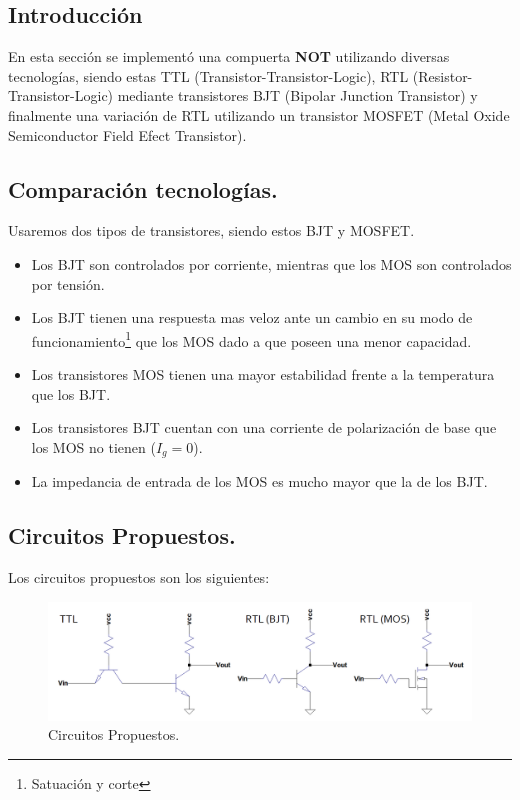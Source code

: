 \documentclass[a4paper]{article}
\begin{document}
\subsection{Introducción}
En esta sección se implementó una compuerta \textbf{NOT} utilizando diversas tecnologías, siendo estas TTL (Transistor-Transistor-Logic), RTL (Resistor-Transistor-Logic) mediante transistores BJT (Bipolar Junction Transistor) y finalmente una variación de RTL utilizando un transistor MOSFET (Metal Oxide Semiconductor Field Efect Transistor).
\subsection{Comparación tecnologías.}
Usaremos dos tipos de transistores, siendo estos BJT y MOSFET.
\begin{itemize}
\item Los BJT son controlados por corriente, mientras que los MOS son controlados por tensión.
\item Los BJT tienen una respuesta mas veloz ante un cambio en su modo de funcionamiento\footnote{Satuación y corte} que los MOS dado a que poseen una menor capacidad.
\item Los transistores MOS tienen una mayor estabilidad frente a la temperatura que los BJT.	
\item Los transistores BJT cuentan con una corriente de polarización de base que los MOS no tienen ($I_g =0$).
\item La impedancia de entrada de los MOS es mucho mayor que la de los BJT.
\end{itemize}
\subsection{Circuitos Propuestos.}
Los circuitos propuestos son los siguientes:

\begin{figure}[H]	
	\centering
	\includegraphics[width=\textwidth]{Imagenes/CircuitosPropuestos.PNG}
	\caption{Circuitos Propuestos.}
	\label{fig:circprop}
\end{figure}
\end{document}
